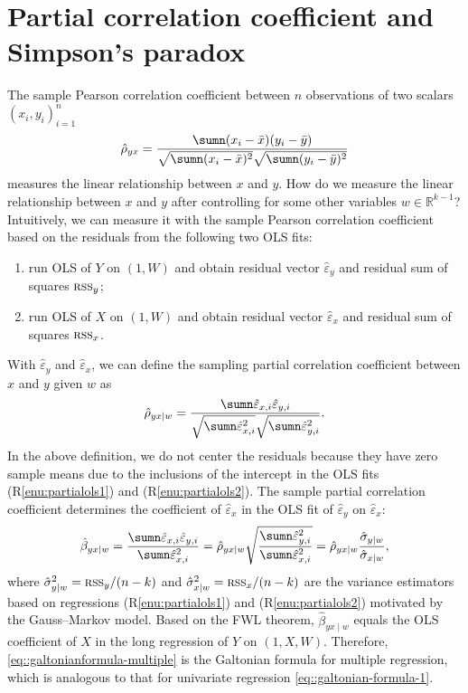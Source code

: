 \section{Partial correlation coefficient and Simpson's paradox\label{sec:Partial-correlation-coefficient}}

The sample Pearson correlation coefficient between $n$ observations of two
scalars $(x_{i},y_{i})_{i=1}^n $
\[
 \hat{\rho}_ {yx}=\frac{\sumn(x_{i}-\bar{x})(y_{i}-\bar{y})}{\sqrt{\sumn(x_{i}-\bar{x})^{2}}\sqrt{\sumn(y_{i}-\bar{y})^{2}}}
\]
measures the linear relationship between $x$ and $y$. How do we
measure the linear relationship between $x$ and $y$ after controlling
for some other variables $w\in\mathbb{R}^{k-1}$? Intuitively, we
can measure it with the sample Pearson correlation coefficient based on the
residuals from the following two OLS fits:
\begin{enumerate}
[(R1)]
\item \label{enu:partialols1}run OLS of $Y$ on $(1,W)$ and obtain residual
vector $\hat{\varepsilon}_{y}$ and residual sum of squares $\textsc{rss}_{y}$;
\item \label{enu:partialols2}run OLS of $X$ on $(1,W)$ and obtain residual
vector $\hat{\varepsilon}_{x}$ and residual sum of squares $\textsc{rss}_{x}$.
\end{enumerate}
%
With $\hat{\varepsilon}_{y}$ and $\hat{\varepsilon}_{x}$, we can
define the sampling partial correlation coefficient between $x$ and $y$ given
$w$ as 
\[
 \hat{\rho}_ {yx\mid w}=\frac{\sumn\hat{\varepsilon}_{x,i}\hat{\varepsilon}_{y,i}}{\sqrt{\sumn\hat{\varepsilon}_{x,i}^{2}}\sqrt{\sumn\hat{\varepsilon}_{y,i}^{2}}}.
\]
 In the above definition, we do not center the residuals because they
have zero sample means due to the inclusions of the intercept in the
OLS fits (R\ref{enu:partialols1}) and (R\ref{enu:partialols2}). The sample partial correlation coefficient determines the coefficient of $\hat{\varepsilon}_{x}$ in the OLS fit  of $\hat{\varepsilon}_{y}$ on $\hat{\varepsilon}_{x}$:
\begin{eqnarray}
\label{eq::galtonianformula-multiple}
\hat{\beta}_{yx\mid w}=\frac{\sumn\hat{\varepsilon}_{x,i}\hat{\varepsilon}_{y,i}}{\sumn\hat{\varepsilon}_{x,i}^{2}}= \hat{\rho}_ {yx\mid w}\sqrt{\frac{\sumn\hat{\varepsilon}_{y,i}^{2}}{\sumn\hat{\varepsilon}_{x,i}^{2}}}= \hat{\rho}_ {yx\mid w}\frac{\hat{\sigma}_{y \mid  w}}{\hat{\sigma}_{x \mid  w}},
\end{eqnarray}
where $\hat{\sigma}_{y \mid  w}^{2}=\textsc{rss}_{y}/(n-k)$ and
$\hat{\sigma}_{x \mid  w}^{2}=\textsc{rss}_{x}/(n-k)$ are the
variance estimators based on regressions (R\ref{enu:partialols1}) and
(R\ref{enu:partialols2}) motivated by the Gauss--Markov model.  Based on the FWL theorem, $\hat{\beta}_{yx\mid w}$
equals the OLS coefficient of $X$ in the long regression of $Y$
on $(1,X,W).$ Therefore,  \eqref{eq::galtonianformula-multiple} is the Galtonian formula for multiple regression, which is analogous to that for univariate regression \eqref{eq::galtonian-formula-1}. 

